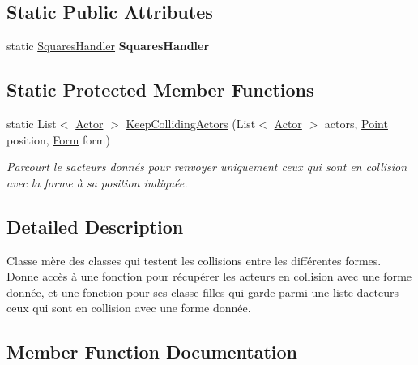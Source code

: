 \subsection*{Static Public Attributes}
\begin{DoxyCompactItemize}
\item 
\mbox{\label{class_tentacle_slicers_1_1collisions_1_1_collision_functions_af72a148cb99cede52981b5e9080dfc30}} 
static \hyperlink{class_tentacle_slicers_1_1maps_1_1_squares_handler}{Squares\+Handler} {\bfseries Squares\+Handler}
\end{DoxyCompactItemize}
\subsection*{Static Protected Member Functions}
\begin{DoxyCompactItemize}
\item 
static List$<$ \hyperlink{class_tentacle_slicers_1_1actors_1_1_actor}{Actor} $>$ \hyperlink{class_tentacle_slicers_1_1collisions_1_1_collision_functions_af02ae1365e63bae367e3549ce009c5e0}{Keep\+Colliding\+Actors} (List$<$ \hyperlink{class_tentacle_slicers_1_1actors_1_1_actor}{Actor} $>$ actors, \hyperlink{class_tentacle_slicers_1_1general_1_1_point}{Point} position, \hyperlink{class_tentacle_slicers_1_1collisions_1_1_form}{Form} form)
\begin{DoxyCompactList}\small\item\em Parcourt le sacteurs donnés pour renvoyer uniquement ceux qui sont en collision avec la forme à sa position indiquée. \end{DoxyCompactList}\end{DoxyCompactItemize}


\subsection{Detailed Description}
Classe mère des classes qui testent les collisions entre les différentes formes. Donne accès à une fonction pour récupérer les acteurs en collision avec une forme donnée, et une fonction pour ses classe filles qui garde parmi une liste d\textquotesingle{}acteurs ceux qui sont en collision avec une forme donnée. 



\subsection{Member Function Documentation}
\mbox{\label{class_tentacle_slicers_1_1collisions_1_1_collision_functions_ae449c2800a053c729dc4010535cdb19f}} 

